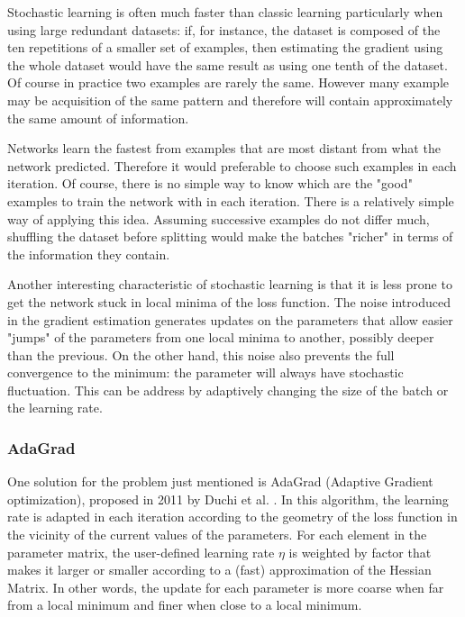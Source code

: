 Stochastic learning is often much faster than classic learning particularly when using large redundant datasets: if, for instance, the dataset is composed of the ten repetitions of a smaller set of examples, then estimating the gradient using the whole dataset would have the same result as using one tenth of the dataset. Of course in practice two examples are rarely the same. However many example may be acquisition of the same pattern and therefore will contain approximately the same amount of information.

Networks learn the fastest from examples that are most distant from what the network predicted. Therefore it would preferable to choose such examples in each iteration. Of course, there is no simple way to know which are the "good" examples to train the network with in each iteration. There is a relatively simple way of applying this idea. Assuming successive examples do not differ much, shuffling the dataset before splitting would make the batches "richer" in terms of the information they contain.

Another interesting characteristic of stochastic learning is that it is less prone to get the network stuck in local minima of the loss function. The noise introduced in the gradient estimation generates updates on the parameters that allow easier "jumps" of the parameters from one local minima to another, possibly deeper than the previous. On the other hand, this noise also prevents the full convergence to the minimum: the parameter will always have stochastic fluctuation. This can be address by  adaptively changing the size of the batch or the learning rate.

\subsubsection{AdaGrad}
\label{subsubsec:Adagrad}
One solution for the problem just mentioned is AdaGrad (Adaptive Gradient optimization), proposed in 2011 by Duchi et al. \cite{duchi2011adaptive}. In this algorithm, the learning rate is adapted in each iteration according to the geometry of the loss function in the vicinity of the current values of the parameters. For each element in the parameter matrix, the user-defined learning rate $\eta$ is weighted by factor that makes it larger or smaller according to a (fast) approximation of the Hessian Matrix. In other words, the update for each parameter is more coarse when far from a local minimum and finer when close to a local minimum.

